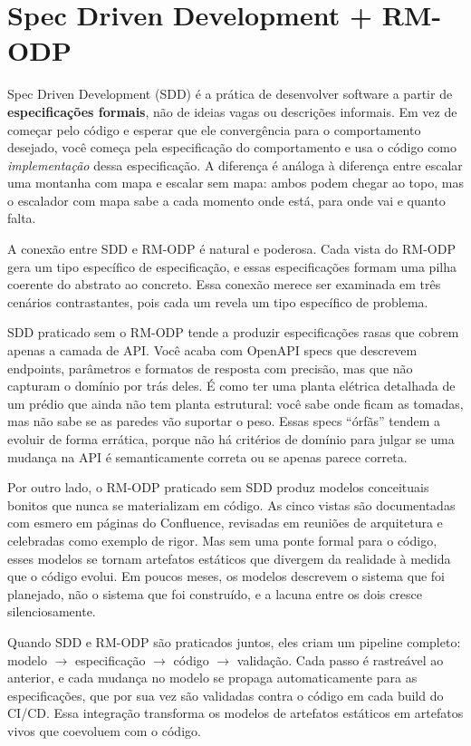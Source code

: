 \section{Spec Driven Development + RM-ODP}

Spec Driven Development (SDD) é a prática de desenvolver software a partir de
\textbf{especificações formais}, não de ideias vagas ou descrições informais.
Em vez de começar pelo código e esperar que ele convergência para o
comportamento desejado, você começa pela especificação do comportamento e
usa o código como \emph{implementação} dessa especificação. A diferença é
análoga à diferença entre escalar uma montanha com mapa e escalar sem mapa:
ambos podem chegar ao topo, mas o escalador com mapa sabe a cada momento onde
está, para onde vai e quanto falta.

A conexão entre SDD e RM-ODP é natural e poderosa. Cada vista do RM-ODP gera
um tipo específico de especificação, e essas especificações formam uma pilha
coerente do abstrato ao concreto. Essa conexão merece ser examinada em três
cenários contrastantes, pois cada um revela um tipo específico de problema.

SDD praticado sem o RM-ODP tende a produzir especificações rasas que cobrem
apenas a camada de API. Você acaba com OpenAPI specs que descrevem endpoints,
parâmetros e formatos de resposta com precisão, mas que não capturam o domínio
por trás deles. É como ter uma planta elétrica detalhada de um prédio que ainda
não tem planta estrutural: você sabe onde ficam as tomadas, mas não sabe se as
paredes vão suportar o peso. Essas specs ``órfãs'' tendem a evoluir de forma
errática, porque não há critérios de domínio para julgar se uma mudança na API
é semanticamente correta ou se apenas parece correta.

Por outro lado, o RM-ODP praticado sem SDD produz modelos conceituais bonitos que
nunca se materializam em código. As cinco vistas são documentadas com esmero em
páginas do Confluence, revisadas em reuniões de arquitetura e celebradas como
exemplo de rigor. Mas sem uma ponte formal para o código, esses modelos se tornam
artefatos estáticos que divergem da realidade à medida que o código evolui. Em
poucos meses, os modelos descrevem o sistema que foi planejado, não o sistema que
foi construído, e a lacuna entre os dois cresce silenciosamente.

Quando SDD e RM-ODP são praticados juntos, eles criam um pipeline completo:
modelo $\to$ especificação $\to$ código $\to$ validação. Cada passo é rastreável
ao anterior, e cada mudança no modelo se propaga automaticamente para as
especificações, que por sua vez são validadas contra o código em cada build do
CI/CD. Essa integração transforma os modelos de artefatos estáticos em artefatos
vivos que coevoluem com o código.

